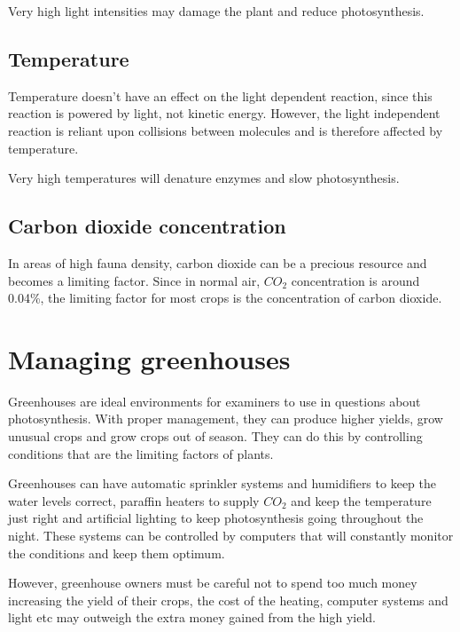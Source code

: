 \documentclass{article}
\begin{document}
Very high light intensities may damage the plant and reduce photosynthesis.

\subsection*{Temperature}
Temperature doesn't have an effect on the light dependent reaction, since this reaction is powered by light, not kinetic energy. However, the light independent reaction is reliant upon collisions between molecules and is therefore affected by temperature.

Very high temperatures will denature enzymes and slow photosynthesis.

\subsection*{Carbon dioxide concentration}
In areas of high fauna density, carbon dioxide can be a precious resource and becomes a limiting factor. Since in normal air, $CO_2$ concentration is around 0.04\%, the limiting factor for most crops is the concentration of carbon dioxide.


\section*{Managing greenhouses}
Greenhouses are ideal environments for examiners to use in questions about photosynthesis. With proper management, they can produce higher yields, grow unusual crops and grow crops out of season. They can do this by controlling conditions that are the limiting factors of plants.

Greenhouses can have automatic sprinkler systems and humidifiers to keep the water levels correct, paraffin heaters to supply $CO_2$ and keep the temperature just right and artificial lighting to keep photosynthesis going throughout the night. These systems can be controlled by computers that will constantly monitor the conditions and keep them optimum.

However, greenhouse owners must be careful not to spend too much money increasing the yield of their crops, the cost of the heating, computer systems and light etc may outweigh the extra money gained from the high yield.
\end{document}
